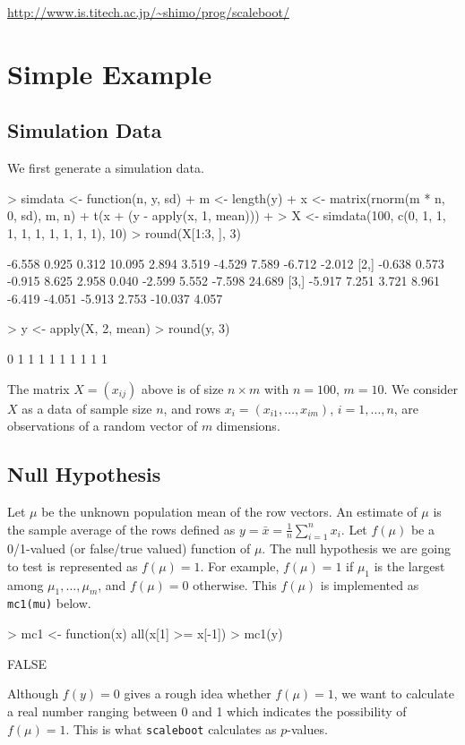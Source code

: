 \documentclass[a4paper]{amsart}
\begin{document}
\url{http://www.is.titech.ac.jp/~shimo/prog/scaleboot/}


\section{Simple Example}

\subsection{Simulation Data}

We first generate a simulation data.
\begin{Schunk}
\begin{Sinput}
> simdata <- function(n, y, sd) {
+     m <- length(y)
+     x <- matrix(rnorm(m * n, 0, sd), m, n)
+     t(x + (y - apply(x, 1, mean)))
+ }
> X <- simdata(100, c(0, 1, 1, 1, 1, 1, 1, 1, 1, 1), 10)
> round(X[1:3, ], 3)
\end{Sinput}
\begin{Soutput}
       [,1]  [,2]   [,3]   [,4]   [,5]   [,6]   [,7]  [,8]    [,9]  [,10]
[1,] -6.558 0.925  0.312 10.095  2.894  3.519 -4.529 7.589  -6.712 -2.012
[2,] -0.638 0.573 -0.915  8.625  2.958  0.040 -2.599 5.552  -7.598 24.689
[3,] -5.917 7.251  3.721  8.961 -6.419 -4.051 -5.913 2.753 -10.037  4.057
\end{Soutput}
\begin{Sinput}
> y <- apply(X, 2, mean)
> round(y, 3)
\end{Sinput}
\begin{Soutput}
 [1] 0 1 1 1 1 1 1 1 1 1
\end{Soutput}
\end{Schunk}
The matrix $X=(x_{ij})$ above is of size $n\times m$ with $n=100$,
$m=10$. We consider $X$ as a data of sample size $n$, and rows
$x_i = (x_{i1},\ldots,x_{im})$, $i=1,\ldots,n$, are observations of a
random vector of $m$ dimensions.

\subsection{Null Hypothesis}

Let $\mu$ be the unknown population mean of the row vectors. An
estimate of $\mu$ is the sample average of the rows defined as $y =
\bar x = \tfrac{1}{n}\sum_{i=1}^n x_i $. Let $f(\mu)$ be a 0/1-valued
(or false/true valued) function of $\mu$. The null hypothesis we are
going to test is represented as $f(\mu)=1$. For example, $f(\mu)=1$ if
$\mu_1$ is the largest among $\mu_1,\ldots,\mu_m$, and $f(\mu)=0$
otherwise. This $f(\mu)$ is implemented as {\tt mc1(mu)} below.
\begin{Schunk}
\begin{Sinput}
> mc1 <- function(x) all(x[1] >= x[-1])
> mc1(y)
\end{Sinput}
\begin{Soutput}
[1] FALSE
\end{Soutput}
\end{Schunk}
Although $f(y)=0$ gives a rough idea whether $f(\mu)=1$, we want to
calculate a real number ranging between 0 and 1 which indicates the
possibility of $f(\mu)=1$.
This is what {\tt scaleboot} calculates as $p$-values. 
\end{document}
